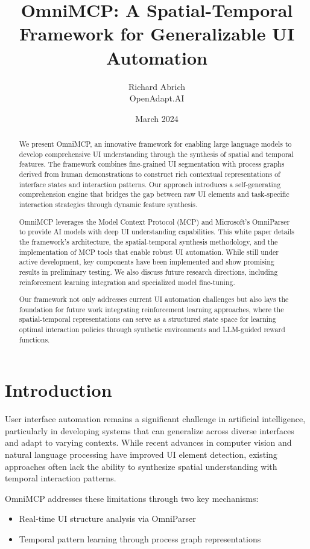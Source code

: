 \documentclass{article}
\title{OmniMCP: A Spatial-Temporal Framework for Generalizable UI Automation}
\author{Richard Abrich \\ OpenAdapt.AI}
\date{March 2024}
\begin{document}
\maketitle

\begin{abstract}
We present OmniMCP, an innovative framework for enabling large language models to develop comprehensive UI understanding through the synthesis of spatial and temporal features. The framework combines fine-grained UI segmentation with process graphs derived from human demonstrations to construct rich contextual representations of interface states and interaction patterns. Our approach introduces a self-generating comprehension engine that bridges the gap between raw UI elements and task-specific interaction strategies through dynamic feature synthesis.

OmniMCP leverages the Model Context Protocol (MCP) and Microsoft's OmniParser to provide AI models with deep UI understanding capabilities. This white paper details the framework's architecture, the spatial-temporal synthesis methodology, and the implementation of MCP tools that enable robust UI automation. While still under active development, key components have been implemented and show promising results in preliminary testing. We also discuss future research directions, including reinforcement learning integration and specialized model fine-tuning.

Our framework not only addresses current UI automation challenges but also lays the foundation for future work integrating reinforcement learning approaches, where the spatial-temporal representations can serve as a structured state space for learning optimal interaction policies through synthetic environments and LLM-guided reward functions.
\end{abstract}

\section{Introduction}

User interface automation remains a significant challenge in artificial intelligence, particularly in developing systems that can generalize across diverse interfaces and adapt to varying contexts. While recent advances in computer vision and natural language processing have improved UI element detection, existing approaches often lack the ability to synthesize spatial understanding with temporal interaction patterns.

OmniMCP addresses these limitations through two key mechanisms:
\begin{itemize}
    \item Real-time UI structure analysis via OmniParser
    \item Temporal pattern learning through process graph representations
\end{itemize}
\end{document}
